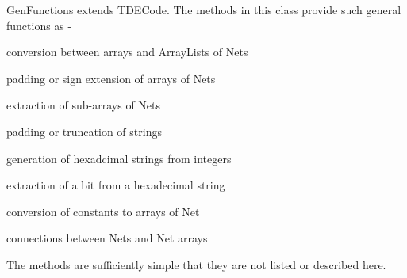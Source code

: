 GenFunctions extends TDECode. The methods in this class provide
such general functions as -

\blist
\item   conversion between arrays and ArrayLists of Nets
\item   padding or sign extension of arrays of Nets
\item   extraction of sub-arrays of Nets
\item   padding or truncation of strings
\item   generation of hexadcimal strings from integers
\item   extraction of a bit from a hexadecimal string
\item   conversion of constants to arrays of Net
\item   connections between Nets and Net arrays
\blend

The methods are sufficiently simple that they are not listed or
described here.
